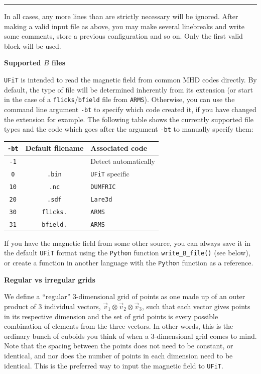\documentclass[12pt,twoside]{article}
\begin{document}
\noindent\rule{\linewidth}{0.4pt}

\vspace{2mm}

In all cases, any more lines than are strictly necessary will be ignored. After making a valid input file as above, you may make several linebreaks and write some comments, store a previous configuration and so on. Only the first valid block will be used.

\vspace{2mm}
{\Large \textbf{Supported $B$ files}}

\texttt{UFiT} is intended to read the magnetic field from common MHD codes directly. By default, the type of file will be determined inherently from its extension (or start in the case of a \texttt{flicks}/\texttt{bfield} file from \texttt{ARMS}). Otherwise, you can use the command line argument \texttt{-bt} to specify which code created it, if you have changed the extension for example. The following table shows the currently supported file types and the code which goes after the argument \texttt{-bt} to manually specify them:

\vspace{2mm}
\begin{tabular}{|c|c|l|}		
		\hline
		\texttt{-bt} & \textbf{Default filename} & \textbf{Associated code} \\\hline\hline
		\texttt{-1} &  & Detect automatically \\\hline
		\texttt{0}  &  \texttt{.bin} & \texttt{UFiT} specific \\\hline
		\texttt{10} & \texttt{.nc} & \texttt{DUMFRIC} \\\hline
		\texttt{20} & \texttt{.sdf} & \texttt{Lare3d} \\\hline
		\texttt{30} & \texttt{flicks.} & \texttt{ARMS} \\\hline
		\texttt{31} & \texttt{bfield.} & \texttt{ARMS} \\\hline
\end{tabular}
\vspace{2mm}

If you have the magnetic field from some other source, you can always save it in the default \texttt{UFiT} format using the \texttt{Python} function \texttt{write\_B\_file()} (see below), or create a function in another language with the \texttt{Python} function as a reference.

{\large \textbf{Regular vs irregular grids}}

We define a ``regular'' 3-dimensional grid of points as one made up of an outer product of 3 individual vectors, $\vec{v}_1 \otimes \vec{v}_2 \otimes \vec{v}_3$, such that each vector gives points in its respective dimension and the set of grid points is every possible combination of elements from the three vectors. In other words, this is the ordinary bunch of cuboids you think of when a 3-dimensional grid comes to mind. Note that the spacing between the points does not need to be constant, or identical, and nor does the number of points in each dimension need to be identical. This is the preferred way to input the magnetic field to \texttt{UFiT}.
\end{document}

